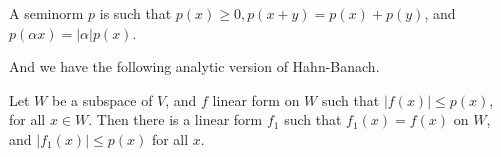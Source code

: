 \documentclass[openany]{book}
\begin{document}
\begin{defn}
    A seminorm $p$ is such that $p(x)\geq 0, p(x+y)=p(x)+p(y)$, and $p(\alpha x)=|\alpha|p(x)$.
\end{defn}

And we have the following analytic version of Hahn-Banach.
\begin{prop}
    Let $W$ be a subspace of $V$, and $f$ linear form on $W$ such that $|f(x)|\leq p(x)$, for all $x\in W$. Then there is a linear form $f_1$ such that $f_1(x)=f(x)$ on $W$, and $|f_1(x)|\leq p(x)$ for all $x$.
\end{prop}
\end{document}

